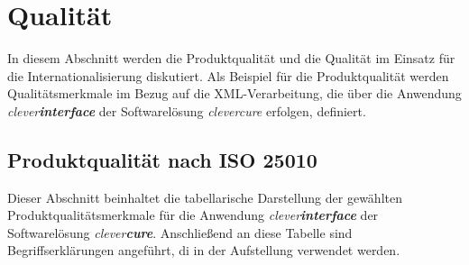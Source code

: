 \section{Qualität}
\label{sec:quality}
In diesem Abschnitt werden die Produktqualität und die Qualität im Einsatz für die Internationalisierung diskutiert.
\newline
\newline
Als Beispiel für die Produktqualität werden Qualitätsmerkmale im Bezug auf die XML-Verarbeitung, die über die Anwendung \emph{clever\textbf{interface}} der Softwarelösung \emph{clevercure} erfolgen, definiert.
\subsection{Produktqualität nach ISO 25010}
\label{sec:qualtity-product-quality}
Dieser Abschnitt beinhaltet die tabellarische Darstellung der gewählten Produktqualitätsmerkmale für die Anwendung \emph{clever\textbf{interface}} der Softwarelösung \emph{clever\textbf{cure}}. Anschließend an diese Tabelle sind Begriffserklärungen angeführt, di in der Aufstellung verwendet werden.
\newline
\newline
\bgroup
\def\arraystretch{1.5}%
